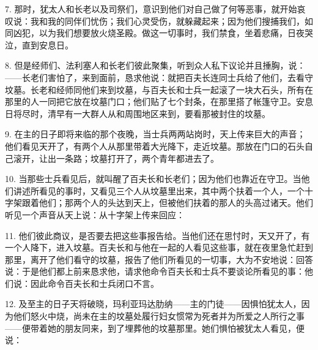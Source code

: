 7. 那时，犹太人和长老以及司祭们，意识到他们对自己做了何等恶事，就开始哀叹说：我和我的同伴们忧伤；我们心灵受伤，就躲藏起来；因为他们搜捕我们，如同凶犯，以为我们想要放火烧圣殿。做这一切事时，我们禁食，坐着悲痛，日夜哭泣，直到安息日。\par

8. 但是经师们、法利塞人和长老们彼此聚集，听到众人私下议论并且捶胸，说：——长老们害怕了，来到面前，恳求他说：就把百夫长连同士兵给了他们，去看守坟墓。长老和经师同他们来到坟墓，与百夫长和士兵一起滚了一块大石头，所有在那里的人一同把它放在坟墓门口；他们贴了七个封条，在那里搭了帐篷守卫。安息日将尽时，清早有一大群人从和周围地区来到，要看那被封住的坟墓。\par

9. 在主的日子即将来临的那个夜晚，当士兵两两站岗时，天上传来巨大的声音；他们看见天开了，有两个人从那里带着大光降下，走近坟墓。那放在门口的石头自己滚开，让出一条路；坟墓打开了，两个青年都进去了。\par

10. 当那些士兵看见后，就叫醒了百夫长和长老们；因为他们也靠近在守卫。当他们讲述所看见的事时，又看见三个人从坟墓里出来，其中两个扶着一个人，一个十字架跟着他们；那两个人的头达到天上，但被他们扶着的那人的头高过诸天。他们听见一个声音从天上说：从十字架上传来回应：\par

11. 他们彼此商议，是否要去把这些事报告给。当他们还在思忖时，天又开了，有一个人降下，进入坟墓。百夫长和与他在一起的人看见这些事，就在夜里急忙赶到那里，离开了他们看守的坟墓，报告了他们所看见的一切事，大为不安地说：回答说：于是他们都上前来恳求他，请求他命令百夫长和士兵不要谈论所看见的事：他们说：因此命令百夫长和士兵闭口不言。\par

12. 及至主的日子天将破晓，玛利亚玛达肋纳——主的门徒——因惧怕犹太人，因为他们怒火中烧，尚未在主的坟墓处履行妇女惯常为死者并为所爱之人所行之事——便带着她的朋友同来，到了埋葬他的坟墓那里。她们惧怕被犹太人看见，便说：\par

